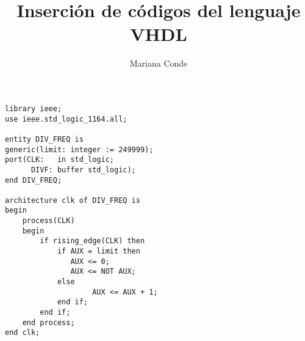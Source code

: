 \documentclass{article}
\title{Inserción de códigos del lenguaje VHDL}
\author{Mariana Conde}
\date{}
\begin{document}
\maketitle

\begin{mdframed}[style=topbottomframe]
\begin{lstlisting}[caption={Divisor de frecuencia},label={lst:div_freq}]
library ieee;
use ieee.std_logic_1164.all;

entity DIV_FREQ is
generic(limit: integer := 249999);
port(CLK:	in std_logic;
	  DIVF:	buffer std_logic);
end DIV_FREQ;

architecture clk of DIV_FREQ is
begin
    process(CLK)
    begin
        if rising_edge(CLK) then
            if AUX = limit then
               AUX <= 0;
               AUX <= NOT AUX;
            else
					AUX <= AUX + 1;
            end if;
        end if;
    end process;
end clk;
\end{lstlisting}
\end{mdframed}
\end{document}
